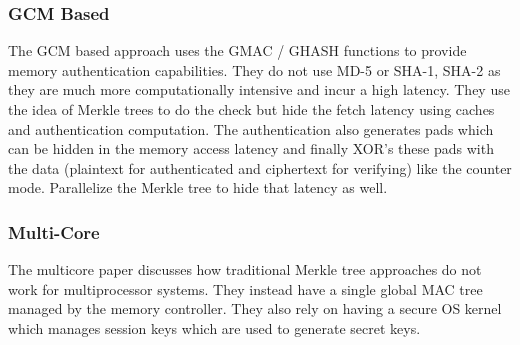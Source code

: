 \subsubsection{GCM Based}
The GCM based approach uses the GMAC / GHASH functions to provide memory
authentication capabilities. They do not use MD-5 or SHA-1, SHA-2 as they are
much more computationally intensive and incur a high latency. They use the idea
of Merkle trees to do the  check but hide the fetch latency using
caches and authentication computation. The authentication also generates pads
which can be hidden in the memory access latency and finally XOR's these pads
with the data (plaintext for authenticated and ciphertext for verifying) like
the counter mode. Parallelize the Merkle tree to hide that latency as well.

\subsubsection{Multi-Core}
The multicore paper \cite{multicoreEnc} discusses how traditional Merkle tree
approaches do not work for multiprocessor systems. They instead have a single
global MAC tree managed by the memory controller. They also rely on having a
secure OS kernel which manages session keys which are used to generate secret
keys.
